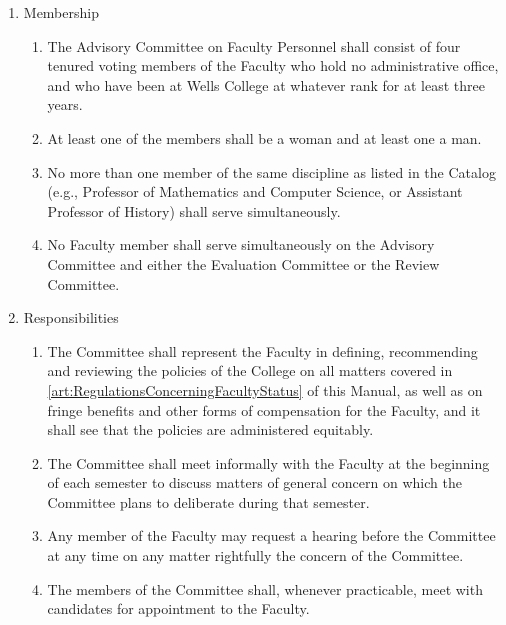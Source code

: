\documentclass{manual}
\newcommand{\itemLevelA}{\alph*.}
\newcommand{\itemLevelB}{\arabic*)}
\newcommand{\itemRefA}{\alph*}
\newcommand{\itemRefB}{\arabic*}
\begin{document}
\begin{enumerate}[label=\itemLevelA,ref=\itemRefA]
\item Membership \label{item:membership06}
\begin{enumerate}[label=\itemLevelB,ref=\itemRefB]
\item The Advisory Committee on Faculty Personnel shall consist of four tenured voting members of the Faculty who hold no administrative office, and who have been at Wells College at whatever rank for at least three years.
\item At least one of the members shall be a woman and at least one a man.
\item\label{iitem:crossdiscipline07} No more than one member of the same discipline as listed in the Catalog (e.g., Professor of Mathematics and Computer Science, or Assistant Professor of History) shall serve simultaneously.
\item No Faculty member shall serve simultaneously on the Advisory Committee and either the Evaluation Committee or the Review Committee.
\end{enumerate}
\item Responsibilities
\begin{enumerate}[label=\itemLevelB,ref=\itemRefB]
\item The Committee shall represent the Faculty in defining, recommending and reviewing the policies of the College on all matters covered in \cref{art:RegulationsConcerningFacultyStatus} of this Manual, as well as on fringe benefits and other forms of compensation for the Faculty, and it shall see that the policies are administered equitably.
\item The Committee shall meet informally with the Faculty at the beginning of each semester to discuss matters of general concern on which the Committee plans to deliberate during that semester.
\item Any member of the Faculty may request a hearing before the Committee at any time on any matter rightfully the concern of the Committee.
\item The members of the Committee shall, whenever practicable, meet with candidates for appointment to the Faculty.


\end{enumerate}
\end{enumerate}
\end{document}
